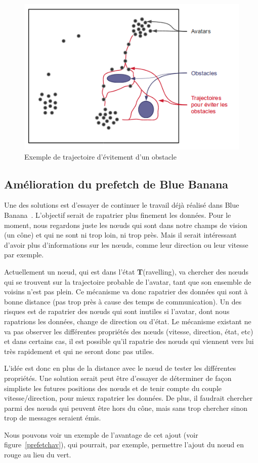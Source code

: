 	\begin{figure}[!h]
        \centering
        \includegraphics[scale=0.55]{./Ressources/Images/trajobstacle}
        \caption{Exemple de trajectoire d'évitement d'un obstacle}
        \label{trajobstacle}
	\end{figure}

\newpage
\subsection{Amélioration du prefetch de Blue Banana}
Une des solutions est d'essayer de continuer le travail déjà réalisé dans Blue Banana~\cite{191}. L'objectif serait de rapatrier plus finement les données. Pour le moment, nous regardons juste les nœuds qui sont dans notre champs de vision (un cône) et qui ne sont ni trop loin, ni trop près. Mais il serait intéressant d'avoir plus d'informations sur les nœuds, comme leur direction ou leur vitesse par exemple. 
\par Actuellement un nœud, qui est dans l'état \textbf{T}(ravelling), va chercher des nœuds qui se trouvent sur la trajectoire probable de l'avatar, tant que son ensemble de voisins n'est pas plein. Ce mécanisme va donc rapatrier des données qui sont à bonne distance (pas trop près à cause des temps de communication). Un des risques est de rapatrier des nœuds qui sont inutiles si l'avatar, dont nous rapatrions les données, change de direction ou d'état. Le mécanisme existant ne va pas observer les différentes propriétés des nœuds (vitesse, direction, état, etc) et dans certains cas, il est possible qu'il rapatrie des nœuds qui viennent vers lui très rapidement et qui ne seront donc pas utiles.
\par L'idée est donc en plus de la distance avec le nœud de tester les différentes propriétés. Une solution serait peut être d'essayer de déterminer de façon simpliste les futures positions des nœuds et de tenir compte du couple vitesse/direction, pour mieux rapatrier les données. De plus, il faudrait chercher parmi des nœuds qui peuvent être hors du cône, mais sans trop chercher sinon trop de messages seraient émis.
\par  Nous pouvons voir un exemple de l'avantage de cet ajout (voir figure~\ref{prefetchav}), qui pourrait, par exemple, permettre l'ajout du nœud en rouge au lieu du vert.

